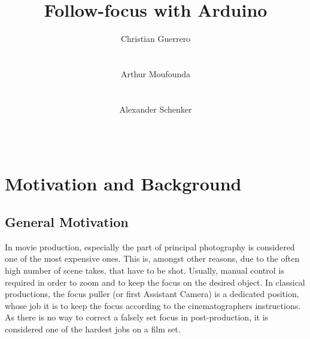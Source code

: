 \documentclass{sigchi}
\begin{document}
\title{Follow-focus with Arduino}

\author{
  \alignauthor Christian Guerrero\\
    \\
    \\
  \alignauthor Arthur Moufounda\\
    \\
    \\
  \alignauthor Alexander Schenker\\
    \\
    \\
}

\maketitle

\begin{abstract}

\end{abstract}


\section{Motivation and Background}

\subsection{General Motivation}
In movie production, especially the part of principal photography is considered one of the most expensive ones. This is, amongst other reasons, due to the often high number of scene takes, that have to be shot. \cite{kcrabb}
Usually, manual control is required in order to zoom and to keep the focus on the desired object. In classical productions, the focus puller (or first Assistant Camera) is a dedicated position, whose job it is to keep the focus according to the cinematographers instructions. As there is no way to correct a falsely set focus in post-production, it is considered one of the hardest jobs on a film set. \cite{cineman}
\end{document}
